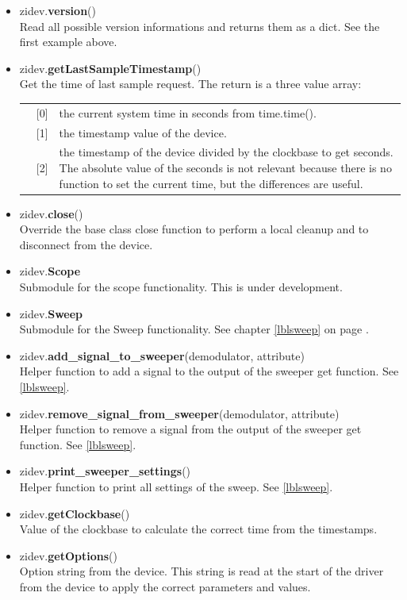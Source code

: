 \documentclass[11pt]{article} %
\begin{document}
\begin{itemize}
\item zidev.{\bf version}() \\
  	Read all possible version informations and returns them as a dict. See the first example above.

\item zidev.{\bf getLastSampleTimestamp}() \\
	Get the time of last sample request. The return is a three value array:
	\begin{longtable}{p{1.5cm}p{0.5cm}p{14.4cm}}
	& [0] & the current system time in seconds from time.time(). \\
	& [1] & the timestamp value of the device. \\
	& [2] & the timestamp of the device divided by the clockbase to get seconds. The absolute value of the seconds is not relevant because there is no function to set the current time, but the differences are useful. \\
	\end{longtable}

\item zidev.{\bf close}() \\
	Override the base class close function to perform a local cleanup and to disconnect from the device.

\item zidev.{\bf Scope} \\
  	Submodule for the scope functionality. This is under development.

\item zidev.{\bf Sweep} \\
	Submodule for the Sweep functionality. See chapter \ref{lblsweep} on page \pageref{lblsweep}.
\item zidev.{\bf add\_signal\_to\_sweeper}(demodulator, attribute) \\
	Helper function to add a signal to the output of the sweeper get function. See \ref{lblsweep}.
\item zidev.{\bf remove\_signal\_from\_sweeper}(demodulator, attribute) \\
	Helper function to remove a signal from the output of the sweeper get function. See \ref{lblsweep}.
\item zidev.{\bf print\_sweeper\_settings}() \\
	Helper function to print all settings of the sweep. See \ref{lblsweep}.

\item zidev.{\bf getClockbase}() \\
	Value of the clockbase to calculate the correct time from the timestamps.

\item zidev.{\bf getOptions}() \\
	Option string from the device. This string is read at the start of the driver from the device to apply the correct parameters and values.
  
\end{itemize}
\end{document}
